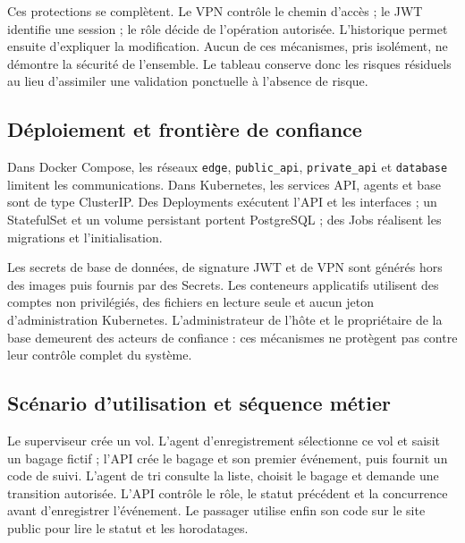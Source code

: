 \documentclass[11pt]{extarticle}
\begin{document}
Ces protections se complètent. Le VPN contrôle le chemin d'accès ; le JWT identifie une session ; le rôle décide de l'opération autorisée. L'historique permet ensuite d'expliquer la modification. Aucun de ces mécanismes, pris isolément, ne démontre la sécurité de l'ensemble. Le tableau conserve donc les risques résiduels au lieu d'assimiler une validation ponctuelle à l'absence de risque.

\subsection{Déploiement et frontière de confiance}
Dans Docker Compose, les réseaux \texttt{edge}, \texttt{public\_api}, \texttt{private\_api} et \texttt{database} limitent les communications. Dans Kubernetes, les services API, agents et base sont de type ClusterIP. Des Deployments exécutent l'API et les interfaces ; un StatefulSet et un volume persistant portent PostgreSQL ; des Jobs réalisent les migrations et l'initialisation.

Les secrets de base de données, de signature JWT et de VPN sont générés hors des images puis fournis par des Secrets. Les conteneurs applicatifs utilisent des comptes non privilégiés, des fichiers en lecture seule et aucun jeton d'administration Kubernetes. L'administrateur de l'hôte et le propriétaire de la base demeurent des acteurs de confiance : ces mécanismes ne protègent pas contre leur contrôle complet du système.
\subsection{Scénario d'utilisation et séquence métier}
Le superviseur crée un vol. L'agent d'enregistrement sélectionne ce vol et saisit un bagage fictif ; l'API crée le bagage et son premier événement, puis fournit un code de suivi. L'agent de tri consulte la liste, choisit le bagage et demande une transition autorisée. L'API contrôle le rôle, le statut précédent et la concurrence avant d'enregistrer l'événement. Le passager utilise enfin son code sur le site public pour lire le statut et les horodatages.
\end{document}
